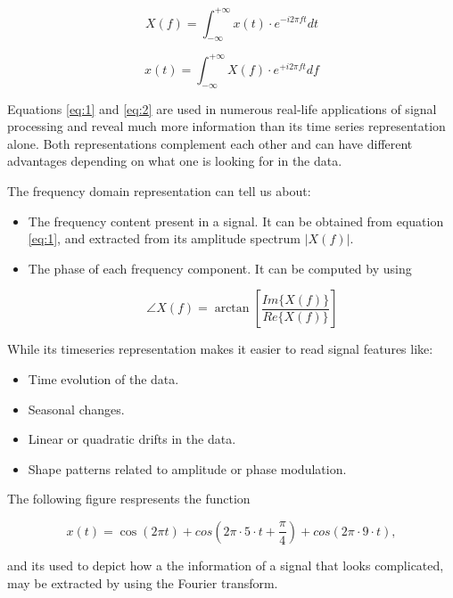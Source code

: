 \begin{equation}
\label{eq:1}
X(f) = \int_{-\infty}^{+\infty} x(t)\cdot e^{-i2\pi f t} dt
\end{equation}

\begin{equation}
\label{eq:2}
x(t) = \int_{-\infty}^{+\infty} X(f)\cdot e^{+i2\pi f t} df
\end{equation}

Equations \ref{eq:1} and \ref{eq:2} are used in numerous real-life applications of signal processing and reveal much more information than its time series representation alone. Both representations complement each other and can have different advantages depending on what one is looking for in the data. 

The frequency domain representation can tell us about:

\begin{itemize}
\item 
The frequency content present in a signal. It can be obtained from equation \ref{eq:1}, and extracted from its amplitude spectrum $|X(f)|$.
\item 
The phase of each frequency component. It can be computed by using 

\begin{equation}
\angle X(f) = \arctan\left[\frac{Im\{X(f)\}}{Re\{X(f)\}}\right]
\end{equation}

\end{itemize}

While its timeseries representation makes it easier to read signal features like:

\begin{itemize}
\item Time evolution of the data.
\item Seasonal changes.
\item Linear or quadratic drifts in the data.
\item Shape patterns related to amplitude or phase modulation.

\end{itemize}

The following figure respresents the function 

\begin{equation}\label{tS}
x(t) = \cos(2\pi t) + cos(2\pi\cdot 5\cdot t + \frac{\pi}{4}) + cos(2\pi\cdot 9\cdot t),
\end{equation}

and its used to depict how a the information of a signal that looks complicated, may be extracted by using the Fourier transform.

